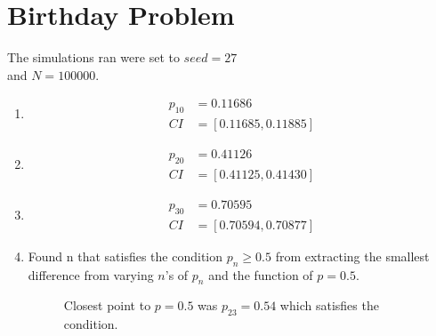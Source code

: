 \documentclass[twocolumn]{article}
\newcommand{\authorname}{Austin J. Maddison}
\begin{document}


\title{}
\author{\small \authorname \\ \small Mahidol University International College}
\date{\small \today}


%
\twocolumn[{
  \maketitle
}]




\section{Birthday Problem}\label{p1}

The simulations ran were set to $seed=27$ \\and $N=100000$.

\begin{enumerate}[label=\alph*)]
    
\item \begin{align*}
p_{10} &= 0.11686 \\
CI &= [0.11685, 0.11885]
\end{align*}
    
\item \begin{align*}
p_{20} &=  0.41126 \\
CI &= [0.41125, 0.41430]
\end{align*}

\item \begin{align*}
p_{30} &= 0.70595 \\
CI &= [0.70594, 0.70877]
\end{align*}


\item 
Found n that satisfies the condition $p_n \ge 0.5$  from extracting the smallest difference from varying $n$'s of $p_n$ and the function of $p=0.5$.

	
\begin{figure}[H]
    \centering
    \caption{Closest point to $p=0.5$ was $p_{23}=0.54$ which satisfies the condition.}
\end{figure}

\end{enumerate}
\pagebreak
\end{document}
